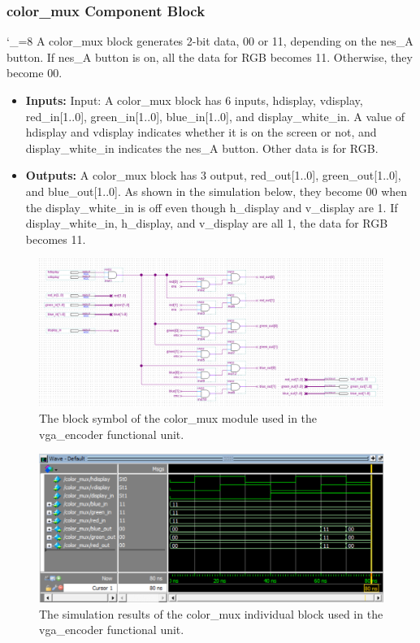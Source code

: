 \documentclass[a4paper]{article}
\begin{document}
\subsubsection{color_mux Component Block}
\catcode`_=8
A color\_mux block generates 2-bit data, 00 or 11, depending on the nes\_A button. If nes\_A button is on, all the data for RGB becomes 11. Otherwise, they become 00.
\begin{itemize}
\item \textbf{Inputs:  } Input: A color\_mux block has 6 inputs, hdisplay, vdisplay, red\_in[1..0], green\_in[1..0], blue\_in[1..0], and display\_white\_in. A value of hdisplay and vdisplay indicates whether it is on the screen or not, and display\_white\_in indicates the nes\_A button. Other data is for RGB.
\item \textbf{Outputs: } A color\_mux block has 3 output, red\_out[1..0], green\_out[1..0], and blue\_out[1..0]. As shown in the simulation below, they become 00 when the display\_white\_in is off even though h\_display and v\_display are 1. If display\_white\_in, h\_display, and v\_display are all 1, the data for RGB becomes 11.
\end{itemize}
\begin{figure}[h]
\centering
\includegraphics[width=.48\textwidth]{functional_units/vga_encoder/individual_blocks/color_mux_block.png}
\caption{The block symbol of the color\_mux module used in the vga\_encoder functional unit.}
\end{figure}
\begin{figure}[h]
  \centering
  \includegraphics[width=.98\textwidth]{functional_units/vga_encoder/individual_blocks/color_mux_sim.png}
  \caption{The simulation results of the color\_mux individual block used in the vga\_encoder functional unit.}
    \label{fig:individual-1-2-sim}
\end{figure}
\clearpage
\end{document}
